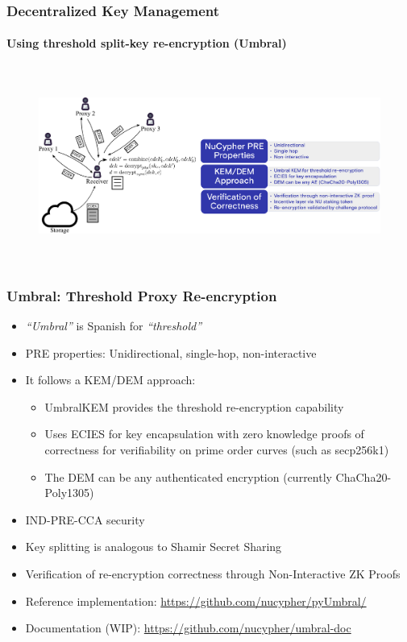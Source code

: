 \documentclass[xetex,mathsans,sans,aspectratio=169]{beamer}
\begin{document}
    \begin{frame}
        \frametitle{Decentralized Key Management}
        \framesubtitle{Using threshold split-key re-encryption (Umbral)}
        \begin{figure}
            \centering
            \includegraphics[height=6.5cm]{pdf/decrypt-umbral.pdf}
        \end{figure}
    \end{frame}

    \begin{frame}
        \frametitle{Umbral: Threshold Proxy Re-encryption}
        \begin{itemize}
        	\item \emph{``Umbral''} is Spanish for \emph{``threshold''}
            \item PRE properties: Unidirectional, single-hop, non-interactive
            \item It follows a KEM/DEM approach:
            	\begin{itemize}
		    \item UmbralKEM provides the threshold re-encryption capability
                    \item Uses ECIES for key encapsulation with zero knowledge proofs of correctness for verifiability on prime order curves (such as secp256k1)
            	    \item The DEM can be any authenticated encryption (currently ChaCha20-Poly1305)
        	\end{itemize}
	    \item IND-PRE-CCA security
            \item Key splitting is analogous to Shamir Secret Sharing
	    \item Verification of re-encryption correctness through Non-Interactive ZK Proofs
            \item Reference implementation: \url{https://github.com/nucypher/pyUmbral/}
	    \item Documentation (WIP): \url{https://github.com/nucypher/umbral-doc}
        \end{itemize}
    \end{frame}
\end{document}
